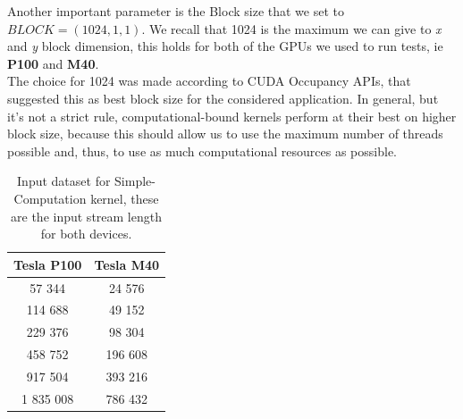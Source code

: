 Another important parameter is the Block size that we set to \(BLOCK = (1024, 1, 1)\). We recall that 1024 is the maximum we can give to \textit{x} and \textit{y} block dimension, this holds for both of the GPUs we used to run tests, ie \textbf{P100} and \textbf{M40}.\\
The choice for 1024 was made according to CUDA Occupancy APIs, that suggested this as best block size for the considered application. In general, but it's not a strict rule, computational-bound kernels perform at their best on higher block size, because this should allow us to use the maximum number of threads possible and, thus, to use as much computational resources as possible.\\
	\begin{table}	
		\centering
		\begin{tabular}{| c c |} 
			\hline
			\textbf{Tesla P100} & \textbf{Tesla M40} \\ [0.5ex] 
			\hline\hline
			
			57 344 & 24 576  \\ 
			\hline		
			114 688	& 49 152  \\ 
			\hline			
			229 376 & 98 304 \\
			\hline				
			458 752 & 196 608 \\
			\hline
			917 504 & 393 216 \\
			\hline
			1 835 008 & 786 432 \\
			\hline

		\end{tabular}
		\caption{Input dataset for Simple-Computation kernel, these are the input stream length for both devices.}	
		\label{tab:cosdata}		
	\end{table}

